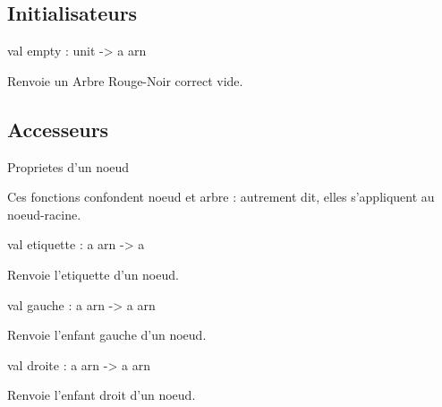 \documentclass[11pt]{article}
\begin{document}
\subsection{Initialisateurs}




\label{val:Arn-underscoredoc.empty}\begin{ocamldoccode}
val empty : unit -> {\textquotesingle}a arn
\end{ocamldoccode}
\begin{ocamldocdescription}
Renvoie un Arbre Rouge-Noir correct vide.


\end{ocamldocdescription}




\subsection{Accesseurs}




Proprietes d'un noeud



Ces fonctions confondent noeud et arbre : 
    autrement dit, elles s'appliquent au noeud-racine.



\label{val:Arn-underscoredoc.etiquette}\begin{ocamldoccode}
val etiquette : {\textquotesingle}a arn -> {\textquotesingle}a
\end{ocamldoccode}
\begin{ocamldocdescription}
Renvoie l'etiquette d'un noeud.


\end{ocamldocdescription}




\label{val:Arn-underscoredoc.gauche}\begin{ocamldoccode}
val gauche : {\textquotesingle}a arn -> {\textquotesingle}a arn
\end{ocamldoccode}
\begin{ocamldocdescription}
Renvoie l'enfant gauche d'un noeud.


\end{ocamldocdescription}




\label{val:Arn-underscoredoc.droite}\begin{ocamldoccode}
val droite : {\textquotesingle}a arn -> {\textquotesingle}a arn
\end{ocamldoccode}
\begin{ocamldocdescription}
Renvoie l'enfant droit d'un noeud.


\end{ocamldocdescription}
\end{document}
